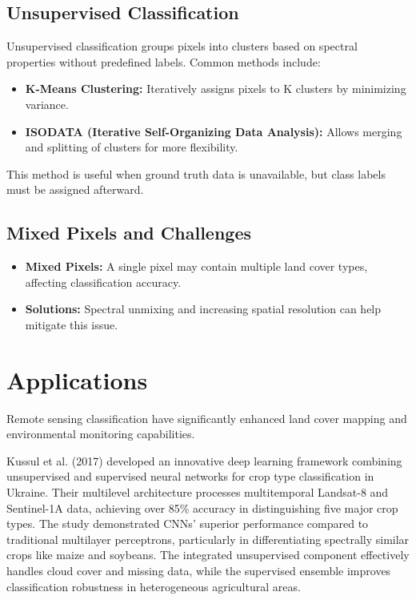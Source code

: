 \documentclass[
  letterpaper,
]{scrbook}
\begin{document}
\subsection{\texorpdfstring{\textbf{Unsupervised
Classification}}{Unsupervised Classification}}\label{unsupervised-classification}

Unsupervised classification groups pixels into clusters based on
spectral properties without predefined labels. Common methods include:

\begin{itemize}
\item
  \textbf{K-Means Clustering:} Iteratively assigns pixels to K clusters
  by minimizing variance.
\item
  \textbf{ISODATA (Iterative Self-Organizing Data Analysis):} Allows
  merging and splitting of clusters for more flexibility.
\end{itemize}

This method is useful when ground truth data is unavailable, but class
labels must be assigned afterward.

\subsection{\texorpdfstring{\textbf{Mixed Pixels and
Challenges}}{Mixed Pixels and Challenges}}\label{mixed-pixels-and-challenges}

\begin{itemize}
\item
  \textbf{Mixed Pixels:} A single pixel may contain multiple land cover
  types, affecting classification accuracy.
\item
  \textbf{Solutions:} Spectral unmixing and increasing spatial
  resolution can help mitigate this issue.
\end{itemize}

\section{Applications}\label{applications-4}

Remote sensing classification have significantly enhanced land cover
mapping and environmental monitoring capabilities.

Kussul et al. (2017) developed an innovative deep learning framework
combining unsupervised and supervised neural networks for crop type
classification in Ukraine. Their multilevel architecture processes
multitemporal Landsat-8 and Sentinel-1A data, achieving over 85\%
accuracy in distinguishing five major crop types. The study demonstrated
CNNs' superior performance compared to traditional multilayer
perceptrons, particularly in differentiating spectrally similar crops
like maize and soybeans. The integrated unsupervised component
effectively handles cloud cover and missing data, while the supervised
ensemble improves classification robustness in heterogeneous
agricultural areas.
\end{document}
